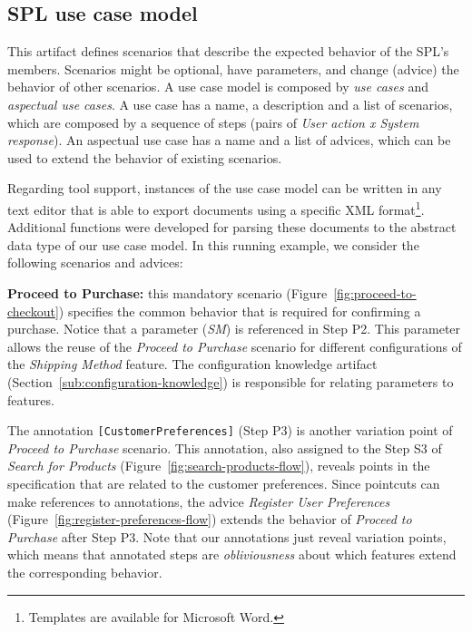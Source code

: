 
\subsection{SPL use case model}\label{sub:spl-uc}

This artifact defines scenarios that describe the expected behavior of the SPL's
members. Scenarios might be optional, have parameters, and change (advice) the
behavior of other scenarios. A use case model is composed by \emph{use cases} and
\emph{aspectual use cases}. A use case has a name, a description and a list of
scenarios, which are composed by a sequence of steps (pairs of \emph{User action x
System response}). An aspectual use case has a name and a list of advices, which
can be used to extend the behavior of existing scenarios.

Regarding tool support, instances of the use case model can
be written in any text editor that is able to export documents using a specific
XML format\footnote{Templates are available for Microsoft Word.}. Additional functions were developed for parsing these documents to the abstract data type of our use case
model. In this running example, we consider the following scenarios and advices:

{\bf Proceed to Purchase:} this mandatory scenario
(Figure~\ref{fig:proceed-to-checkout}) specifies the common behavior that is
required for confirming a purchase. Notice that a parameter (\emph{SM}) is referenced in Step P2. 
This parameter allows the reuse of the \emph{Proceed to
Purchase} scenario for different configurations of the \emph{Shipping Method} feature. The configuration 
knowledge artifact (Section~\ref{sub:configuration-knowledge}) is responsible for relating parameters to features.

The annotation \mbox{\texttt{[CustomerPreferences]}} (Step P3) is
another variation point of \emph{Proceed to Purchase} scenario. This annotation, also assigned to the Step S3 of \emph{Search for Products} (Figure~\ref{fig:search-products-flow}), reveals points in the specification that are related to the customer preferences. Since pointcuts can make references to annotations, the advice \emph{Register User Preferences} (Figure~\ref{fig:register-preferences-flow}) extends the behavior of \emph{Proceed to Purchase} after Step P3. Note that our annotations just reveal variation points, which means that annotated steps are \emph{obliviousness} about which features extend the corresponding behavior. 

